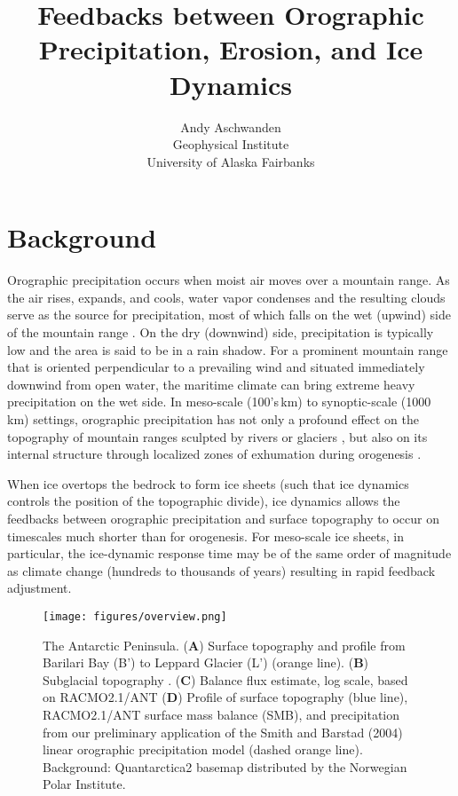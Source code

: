 \documentclass[11pt]{article}
\begin{document}
\title{Feedbacks between Orographic Precipitation, Erosion, and Ice Dynamics}

\author{Andy Aschwanden\\ Geophysical Institute\\ University of Alaska Fairbanks}

\maketitle

\section{Background}

Orographic precipitation occurs when moist air moves over a mountain range. As the air rises, expands, and cools, water vapor condenses and the resulting clouds serve as the source for precipitation, most of which falls on the wet (upwind) side of the mountain range \citep[e.g.,][]{Roe2005}.  On the dry  (downwind) side, precipitation is typically low and the area is said to be in a rain shadow. For a prominent mountain range that is oriented perpendicular to a prevailing wind and situated immediately downwind from open water, the maritime climate can bring extreme heavy precipitation on the wet side. In meso-scale (100's\,km) to synoptic-scale (1000\,km) settings, orographic precipitation has not only a profound effect on the topography of mountain ranges sculpted by rivers or glaciers \citep[e.g.,][]{Roe2003}, but also on its internal structure through localized zones of exhumation during orogenesis \citep[e.g.,][]{Willett1999}. 

When ice overtops the bedrock to form ice sheets (such that ice dynamics controls the position of the topographic divide), ice dynamics allows the feedbacks between orographic precipitation and surface topography to occur on timescales much shorter than for orogenesis. For meso-scale ice sheets, in particular, the ice-dynamic response time may be of the same order of magnitude as climate change (hundreds to thousands of years) resulting in rapid feedback adjustment.

\begin{figure}[htb!]
\begin{center}
\texttt{[image: figures/overview.png]} 
\vspace{-0.5em}
\end{center}
\caption{ The Antarctic Peninsula. ({\bf A}) Surface topography \citep{Cook2012} and profile from Barilari Bay (B') to Leppard Glacier (L') (orange line). ({\bf B}) Subglacial topography \citep{Huss2014a}. ({\bf C}) Balance flux estimate, log scale, based on RACMO2.1/ANT \citep[solid orange line,][]{van2015temperature} ({\bf D}) Profile of surface topography (blue line), RACMO2.1/ANT surface mass balance (SMB), and precipitation from our preliminary application of the Smith and Barstad (2004) linear orographic precipitation model (dashed orange line). Background: Quantarctica2 basemap distributed by the Norwegian Polar Institute.}
\label{f:overview}
\end{figure}
\end{document}
